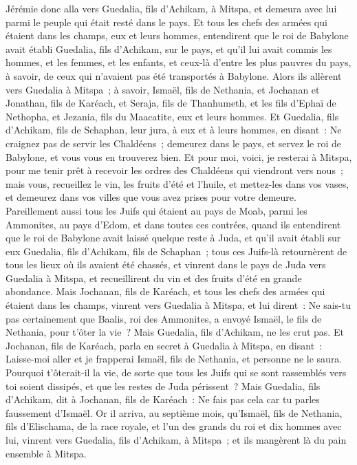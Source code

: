\begin{multicols}{2}
Jérémie donc alla vers Guedalia, fils d'Achikam, à Mitspa, et demeura avec lui parmi le peuple qui était resté dans le pays.
Et tous les chefs des armées qui étaient dans les champs, eux et leurs hommes, entendirent que le roi de Babylone avait établi Guedalia, fils d'Achikam, sur le pays, et qu'il lui avait commis les hommes, et les femmes, et les enfants, et ceux-là d'entre les plus pauvres du pays, à savoir, de ceux qui n'avaient pas été transportés à Babylone.
Alors ils allèrent vers Guedalia à Mitspa~; à savoir, Ismaël, fils de Nethania, et Jochanan et Jonathan, fils de Karéach, et Seraja, fils de Thanhumeth, et les fils d'Ephaï de Nethopha, et Jezania, fils du Maacatite, eux et leurs hommes.
Et Guedalia, fils d'Achikam, fils de Schaphan, leur jura, à eux et à leurs hommes, en disant~: Ne craignez pas de servir les Chaldéens~; demeurez dans le pays, et servez le roi de Babylone, et vous vous en trouverez bien.
Et pour moi, voici, je resterai à Mitspa, pour me tenir prêt à recevoir les ordres des Chaldéens qui viendront vers nous~; mais vous, recueillez le vin, les fruits d'été et l'huile, et mettez-les dans vos vases, et demeurez dans vos villes que vous avez prises pour votre demeure.
Pareillement aussi tous les Juifs qui étaient au pays de Moab, parmi les Ammonites, au pays d'Edom, et dans toutes ces contrées, quand ils entendirent que le roi de Babylone avait laissé quelque reste à Juda, et qu'il avait établi sur eux Guedalia, fils d'Achikam, fils de Schaphan~;
tous ces Juifs-là retournèrent de tous les lieux où ils avaient été chassés, et vinrent dans le pays de Juda vers Guedalia à Mitspa, et recueillirent du vin et des fruits d'été en grande abondance.
Mais Jochanan, fils de Karéach, et tous les chefs des armées qui étaient dans les champs, vinrent vers Guedalia à Mitspa,
et lui dirent~: Ne sais-tu pas certainement que Baalis, roi des Ammonites, a envoyé Ismaël, le fils de Nethania, pour t'ôter la vie~? Mais Guedalia, fils d'Achikam, ne les crut pas.
Et Jochanan, fils de Karéach, parla en secret à Guedalia à Mitspa, en disant~: Laisse-moi aller et je frapperai Ismaël, fils de Nethania, et personne ne le saura. Pourquoi t'ôterait-il la vie, de sorte que tous les Juifs qui se sont rassemblés vers toi soient dissipés, et que les restes de Juda périssent~?
Mais Guedalia, fils d'Achikam, dit à Jochanan, fils de Karéach~: Ne fais pas cela car tu parles faussement d'Ismaël.
\VerseOne{}Or il arriva, au septième mois, qu'Ismaël, fils de Nethania, fils d'Elischama, de la race royale, et l'un des grands du roi et dix hommes avec lui, vinrent vers Guedalia, fils d'Achikam, à Mitspa~; et ils mangèrent là du pain ensemble à Mitspa.

\end{multicols}
